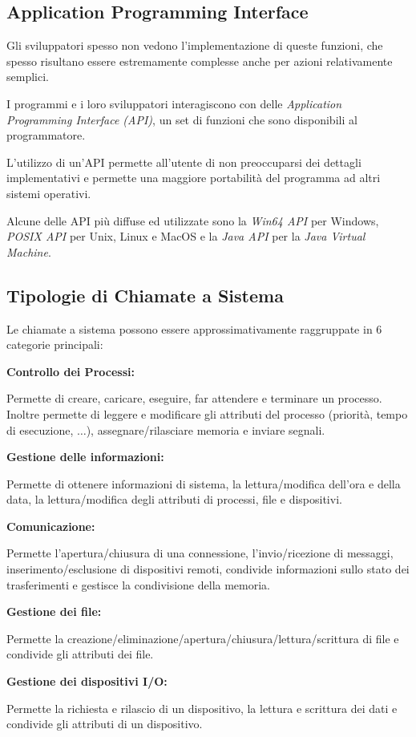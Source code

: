 \subsection{Application Programming Interface}
Gli sviluppatori spesso non vedono l'implementazione di queste funzioni, che spesso risultano essere estremamente complesse anche per azioni relativamente semplici.

I programmi e i loro sviluppatori interagiscono con delle \textit{Application Programming Interface (API)}, un set di funzioni che sono disponibili al programmatore.

\spacer
L'utilizzo di un'API permette all'utente di non preoccuparsi dei dettagli implementativi e permette una maggiore portabilità del programma ad altri sistemi operativi.

\begin{note}
    Alcune delle API più diffuse ed utilizzate sono la \textit{Win64 API} per Windows, \textit{POSIX API} per Unix, Linux e MacOS e la \textit{Java API} per la \textit{Java Virtual Machine}.
\end{note}

\subsection{Tipologie di Chiamate a Sistema}

Le chiamate a sistema possono essere approssimativamente raggruppate in 6 categorie principali:
\begin{sitemize}
    \item \textbf{Controllo dei Processi:}

    Permette di creare, caricare, eseguire, far attendere e terminare un processo. Inoltre permette di leggere e modificare gli attributi del processo (priorità, tempo di esecuzione, $\ldots$), assegnare/rilasciare memoria e inviare segnali.

    \item \textbf{Gestione delle informazioni:}

    Permette di ottenere informazioni di sistema, la lettura/modifica dell'ora e della data, la lettura/modifica degli attributi di processi, file e dispositivi.

    \item \textbf{Comunicazione:}

    Permette l'apertura/chiusura di una connessione, l'invio/ricezione di messaggi, inserimento/esclusione di dispositivi remoti, condivide informazioni sullo stato dei trasferimenti e gestisce la condivisione della memoria.

    \item \textbf{Gestione dei file:}

    Permette la creazione/eliminazione/apertura/chiusura/lettura/scrittura di file e condivide gli attributi dei file.

    \item \textbf{Gestione dei dispositivi I/O:}

    Permette la richiesta e rilascio di un dispositivo, la lettura e scrittura dei dati e condivide gli attributi di un dispositivo.
\end{sitemize}
